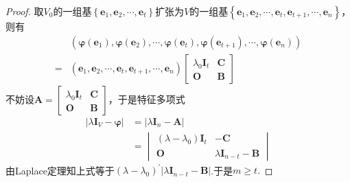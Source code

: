 {\begin{proof}
        取$V_0$的一组基$\left\{
            \bm{e}_1    ,\bm{e}_2,\cdots,\bm{e}_t
            \right\}$扩张为$V$的一组基$\left\{
            \bm{e}_1,\bm{e}_2,\cdots,\bm{e}_t,\bm{e}_{t+1},\cdots,\bm{e}_n
            \right\}$，则有
        \begin{align*}
              & \left(
            \bm{\varphi}\left(
                \bm{e}_1
                \right),
            \bm{\varphi}\left(
                \bm{e}_2
                \right),
            \cdots,
            \bm{\varphi}\left(
                \bm{e}_t
                \right),
            \bm{\varphi}\left(
                \bm{e}_{t+1}
                \right),
            \cdots,
            \bm{\varphi}\left(
                \bm{e}_n
                \right)
            \right)    \\
            = & \left(
            \bm{e}_1,\bm{e}_2,\cdots,\bm{e}_t,\bm{e}_{t+1},\cdots,\bm{e}_n
            \right)\begin{bmatrix}
                       \lambda_0\bm{I}_t & \bm{C} \\
                       \bm{O}            & \bm{B}
                   \end{bmatrix}
        \end{align*}
        不妨设$\bm{A}=\begin{bmatrix}
                \lambda_0\bm{I}_t & \bm{C} \\
                \bm{O}            & \bm{B}
            \end{bmatrix}$，于是特征多项式
        \begin{align*}
            \left|\lambda\bm{I}_V-\bm{\varphi}\right| & =
            \left|
            \lambda \bm{I}_n-\bm{A}
            \right|                                       \\
                                                      & =
            \begin{vmatrix}
                \left(
                \lambda-\lambda_0
                \right)\bm{I}_t & -\bm{C}                    \\
                \bm{O}          & \lambda\bm{I}_{n-t}-\bm{B}
            \end{vmatrix}
        \end{align*}
        由Laplace定理知上式等于$\left(
            \lambda-\lambda_0
            \right)^{\prime}\left|
            \lambda\bm{I}_{n-t}-\bm{B}
            \right|$.于是$m\geqslant t.$
    \end{proof}
}
